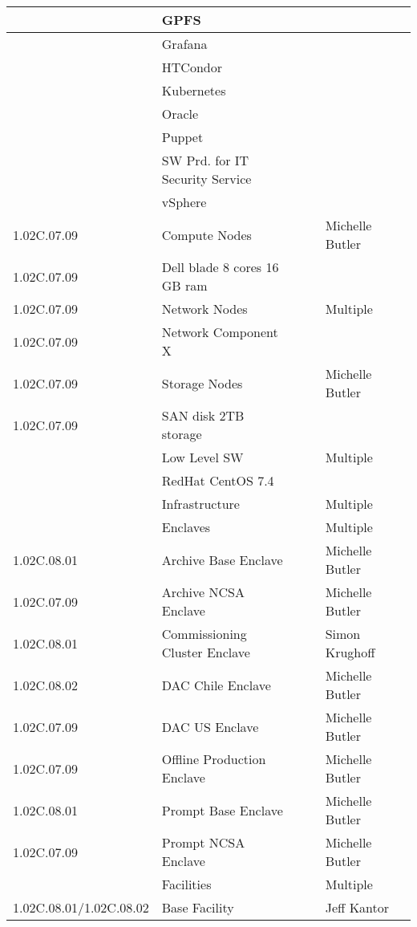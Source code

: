 \begin{longtable}{|p{}|p{}|p{}|p{}|p{}|p{}|}
 &  GPFS &  &  &  & \\ \hline
 &  Grafana &  &  &  & \\ \hline
 &  HTCondor &  &  &  & \\ \hline
 &  Kubernetes &  &  &  & \\ \hline
 &  Oracle &  &  &  & \\ \hline
 &  Puppet &  &  &  & \\ \hline
 &  SW Prd. for IT Security Service &  &  &  & \\ \hline
 &  vSphere &  &  &  & \\ \hline
1.02C.07.09 &  Compute Nodes &  &  & Michelle Butler & \\ \hline
1.02C.07.09 &  Dell blade 8 cores 16 GB ram &  &  &  & \\ \hline
1.02C.07.09 &  Network Nodes &  &  & Multiple & \\ \hline
1.02C.07.09 &  Network Component X &  &  &  & \\ \hline
1.02C.07.09 &  Storage Nodes &  &  & Michelle Butler & \\ \hline
1.02C.07.09 &  SAN disk 2TB storage &  &  &  & \\ \hline
 &  Low Level SW &  &  & Multiple & \\ \hline
 &  RedHat CentOS 7.4 &  &  &  & \\ \hline
 &  Infrastructure &  &  & Multiple & \\ \hline
 &  Enclaves &  &  & Multiple & \\ \hline
1.02C.08.01 &  Archive Base Enclave &  &  & Michelle Butler & \\ \hline
1.02C.07.09 &  Archive NCSA Enclave &  &  & Michelle Butler & \\ \hline
1.02C.08.01 &  Commissioning Cluster Enclave &  &  & Simon Krughoff & \\ \hline
1.02C.08.02 &  DAC Chile Enclave &  &  & Michelle Butler & \\ \hline
1.02C.07.09 &  DAC US Enclave &  &  & Michelle Butler & \\ \hline
1.02C.07.09 &  Offline Production Enclave &  &  & Michelle Butler & \\ \hline
1.02C.08.01 &  Prompt Base Enclave &  &  & Michelle Butler & \\ \hline
1.02C.07.09 &  Prompt NCSA Enclave &  &  & Michelle Butler & \\ \hline
 &  Facilities &  &  & Multiple & \\ \hline
1.02C.08.01/1.02C.08.02 &  Base Facility &  &  & Jeff Kantor & \\ \hline

\end{longtable}
